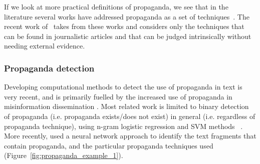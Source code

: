 If we look at more practical definitions of propaganda, we see that in the literature several works have addressed propaganda as a set of techniques~\citep{torok2015symbiotic,miller1939techniques,weston2018rulebook}. The recent work of~\citet{da2019fine} takes from these works and considers only the techniques that can be found in journalistic articles and that can be judged intrinsically without needing external evidence.



\subsubsection{Propaganda detection}
\label{ssec:lit_propaganda_detection}




Developing computational methods to detect the use of propaganda in text is very recent, and is primarily fuelled by the increased use of propaganda in misinformation dissemination \cite{da2020survey}. Most related work is limited to binary detection of propaganda (i.e. propaganda exists/does not exist) in general (i.e. regardless of propaganda technique), using n-gram logistic regression and SVM methods ~\cite{rashkin2017truth,barron2019proppy}. More recently, \citet{da2019fine} used a neural network approach to identify the text fragments that contain propaganda, and the particular propaganda techniques used (Figure~\ref{fig:propaganda_example_1}).




